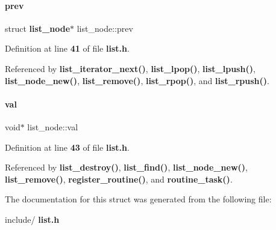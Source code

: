 \paragraph{prev}
{\footnotesize\ttfamily struct \textbf{ list\+\_\+node}$\ast$ list\+\_\+node\+::prev}



Definition at line \textbf{ 41} of file \textbf{ list.\+h}.



Referenced by \textbf{ list\+\_\+iterator\+\_\+next()}, \textbf{ list\+\_\+lpop()}, \textbf{ list\+\_\+lpush()}, \textbf{ list\+\_\+node\+\_\+new()}, \textbf{ list\+\_\+remove()}, \textbf{ list\+\_\+rpop()}, and \textbf{ list\+\_\+rpush()}.

\mbox{\label{structlist__node_a129de89b4c110fa54377ef16ab128ce0}} 
\paragraph{val}
{\footnotesize\ttfamily void$\ast$ list\+\_\+node\+::val}



Definition at line \textbf{ 43} of file \textbf{ list.\+h}.



Referenced by \textbf{ list\+\_\+destroy()}, \textbf{ list\+\_\+find()}, \textbf{ list\+\_\+node\+\_\+new()}, \textbf{ list\+\_\+remove()}, \textbf{ register\+\_\+routine()}, and \textbf{ routine\+\_\+task()}.



The documentation for this struct was generated from the following file\+:\begin{DoxyCompactItemize}
\item 
include/\textbf{ list.\+h}\end{DoxyCompactItemize}

